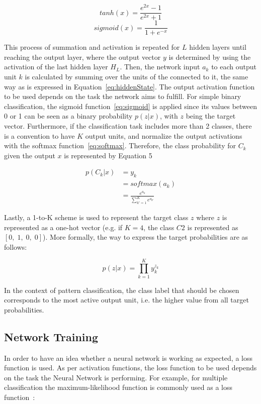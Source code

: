 \begin{equation} \label{eq:tanh}
    tanh(x) = \frac{e^{2x}-1}{e^{2x}+1}
\end{equation}
\begin{equation} \label{eq:sigmoid}
    sigmoid(x) = \frac{1}{1+e^{-x}}
\end{equation}

This process of summation and activation is repeated for $L$ hidden layers until reaching the 
output layer, where the output vector $y$ is determined by using the activation of the last 
hidden layer $H_L$. Then, the network input $a_k$ to each output unit $k$ is calculated by 
summing over the units of the connected to it, the same way as is expressed in Equation~\ref{eq:hiddenState}. 
The output activation function to be used depends on the task the network aims to fulfill. 
For simple binary classification, the sigmoid function~\ref{eq:sigmoid} is applied since its 
values between 0 or 1 can be seen as a binary probability $p(z|x)$, with $z$ being the target 
vector. Furthermore, if the classification task includes more than 2 classes, there is a 
convention to have $K$ output units, and normalize the output activations with the softmax 
function~\ref{eq:softmax}. Therefore, the class probability for $C_k$ given the output $x$ is 
represented by Equation 5

\begin{align} \label{eq:softmax}
    p(C_k|x) & = y_k \nonumber \\
        & = softmax(a_k) \nonumber \\ 
        & = \frac{e^{a_k}}{\sum_{k'=1}^K e^{a_{k'}}}
\end{align}

Lastly, a 1-to-K scheme is used to represent the target class $z$ where $z$ is represented as 
a one-hot vector (e.g. if $K=4$, the class $C2$ is represented as $[0, \; 1, \; 0, \; 0]$). 
More formally, the way to express the target probabilities are as follows:

\[
    p(z|x) = \prod_{k=1}^K y_k^{z_k}
\]

In the context of pattern classification, the class label that should be chosen corresponds to 
the most active output unit, i.e. the higher value from all target probabilities.

\subsection{Network Training}
\label{appendix:neuralNetworks/fundamentals/training}
In order to have an idea whether a neural network is working as expected, a loss function is 
used. As per activation functions, the loss function to be used depends on the task the Neural 
Network is performing.  For example, for multiple classification the maximum-likelihood function 
is commonly used as a loss function~\cite{appendix:bishop1995neural}:

